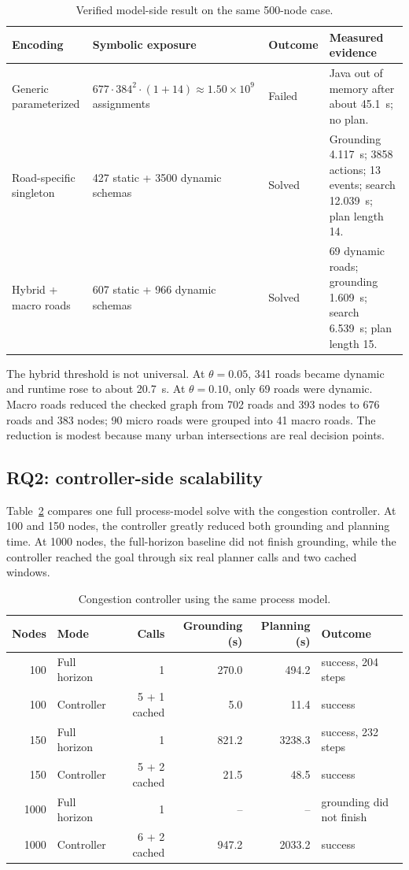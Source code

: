 \documentclass[10pt]{article}
\begin{document}
\begin{table}[H]
\centering
\caption{Verified model-side result on the same 500-node case.}
\label{tab:rq1}
\scriptsize
\begin{tabularx}{\linewidth}{@{}p{2.4cm}Y p{1.45cm}p{3.25cm}@{}}
\toprule
Encoding & Symbolic exposure & Outcome & Measured evidence \\
\midrule
Generic parameterized & $677\cdot384^2\cdot(1+14)\approx1.50\times10^9$ assignments & Failed & Java out of memory after about 45.1~s; no plan. \\
Road-specific singleton & 427 static + 3500 dynamic schemas & Solved & Grounding 4.117~s; 3858 actions; 13 events; search 12.039~s; plan length 14. \\
Hybrid + macro roads & 607 static + 966 dynamic schemas & Solved & 69 dynamic roads; grounding 1.609~s; search 6.539~s; plan length 15. \\
\bottomrule
\end{tabularx}
\end{table}

The hybrid threshold is not universal. At $\theta=0.05$, 341 roads became
dynamic and runtime rose to about 20.7~s. At $\theta=0.10$, only 69 roads were
dynamic. Macro roads reduced the checked graph from 702 roads and 393 nodes to
676 roads and 383 nodes; 90 micro roads were grouped into 41 macro roads. The
reduction is modest because many urban intersections are real decision points.

\subsection{RQ2: controller-side scalability}
Table~\ref{tab:cong-controller} compares one full process-model solve with the
congestion controller. At 100 and 150 nodes, the controller greatly reduced
both grounding and planning time. At 1000 nodes, the full-horizon baseline did
not finish grounding, while the controller reached the goal through six real
planner calls and two cached windows.

\begin{table}[H]
\centering
\caption{Congestion controller using the same process model.}
\label{tab:cong-controller}
\scriptsize
\begin{tabular}{@{}r l r r r l@{}}
\toprule
Nodes & Mode & Calls & Grounding (s) & Planning (s) & Outcome \\
\midrule
100 & Full horizon & 1 & 270.0 & 494.2 & success, 204 steps \\
100 & Controller & 5 + 1 cached & 5.0 & 11.4 & success \\
150 & Full horizon & 1 & 821.2 & 3238.3 & success, 232 steps \\
150 & Controller & 5 + 2 cached & 21.5 & 48.5 & success \\
1000 & Full horizon & 1 & -- & -- & grounding did not finish \\
1000 & Controller & 6 + 2 cached & 947.2 & 2033.2 & success \\
\bottomrule
\end{tabular}
\end{table}
\end{document}
